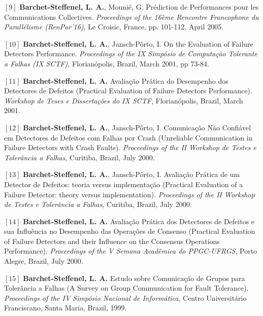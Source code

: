 \documentclass[final,twoside]{hdr} %
\begin{document}
\vspace{1em} \noindent $[9]$
\textbf{Barchet-Steffenel, L. A.}, Mounié, G. {Prédiction de Performances pour les Communications Collectives}. {\em Proceedings of the 16ème Rencontre Francophone du Parallélisme (RenPar'16)}, Le Croisic, France, pp. 101-112, April 2005. 

\vspace{1em} \noindent $[10]$
\textbf{Barchet-Steffenel, L. A.}, Jansch-Pôrto, I. {On the Evaluation of Failure Detectors Performance}. {\em Proceedings of the IX Simpósio de Computação Tolerante a Falhas (IX SCTF)}, Florianópolis, Brazil, March 2001, pp 73-84.

\vspace{1em} \noindent $[11]$
\textbf{Barchet-Steffenel, L. A.} {Avaliação Prática do Desempenho dos Detectores de Defeitos} (Practical Evaluation of Failure Detectors Performance). {\em Workshop de Teses e Dissertações do IX SCTF}, Florianópolis, Brazil, March 2001. 

\vspace{1em} \noindent $[12]$
\textbf{Barchet-Steffenel, L. A.}, Jansch-Pôrto, I. {Comunicação Não Confiável em Detectores de Defeitos com Falhas por Crash} (Unreliable Communication in Failure Detectors with Crash Faults). {\em Proceedings of the II Workshop de Testes e Tolerância a Falhas}, Curitiba, Brazil, July 2000. 

\vspace{1em} \noindent $[13]$
\textbf{Barchet-Steffenel, L. A.}, Jansch-Pôrto, I. {Avaliação Prática de um Detector de Defeitos: teoria versus implementação} (Practical Evaluation of a Failure Detector: theory versus implementation). {\em Proceedings of the II Workshop de Testes e Tolerância a Falhas}, Curitiba, Brazil, July 2000. 

\vspace{1em} \noindent $[14]$
\textbf{Barchet-Steffenel, L. A.} {Avaliação Prática dos Detectores de Defeitos e sua Influência no Desempenho das Operações de Consenso} (Practical Evaluation of Failure Detectors and their Influence on the Consensus Operations Performance). {\em Proceedings of the V Semana Acadêmica do PPGC-UFRGS}, Porto Alegre, Brazil, July 2000. 

\vspace{1em} \noindent $[15]$
\textbf{Barchet-Steffenel, L. A.} {Estudo sobre Comunicação de Grupos para Tolerância a Falhas} (A Survey on Group Communication for Fault Tolerance). {\em Proceedings of the IV Simpósio Nacional de Informática}, Centro Universitário Franciscano, Santa Maria, Brazil, 1999. 
\end{document}
